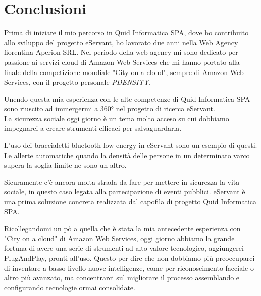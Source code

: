 \chapter{Conclusioni}

Prima di iniziare il mio percorso in Quid Informatica SPA, dove ho contribuito allo
sviluppo del progetto eServant, ho lavorato due anni nella Web Agency fiorentina Aperion SRL.
Nel periodo della web agency mi sono dedicato per passione ai servizi cloud di Amazon
Web Services che mi hanno portato alla finale della competizione mondiale "City on a
cloud", sempre di Amazon Web Services, con il progetto personale \textit{PDENSITY}.

Unendo questa mia esperienza con le alte competenze di Quid Informatica SPA sono 
riuscito ad immergermi a 360° nel progetto di ricerca eServant.\\

La sicurezza sociale oggi giorno è un tema molto acceso su cui dobbiamo
impegnarci a creare strumenti efficaci per salvaguardarla.

L'uso dei braccialetti bluetooth low energy in eServant sono un esempio di questi.
Le allerte automatiche quando la densità delle persone in un determinato varco
supera la soglia limite ne sono un altro.

Sicuramente c'è ancora molta strada da fare per mettere in sicurezza la vita 
sociale, in questo caso legata alla partecipazione di eventi pubblici. eServant 
è una prima soluzione concreta realizzata dal capofila di progetto Quid Informatica SPA.

Ricollegandomi un pò a quella che è stata la mia antecedente esperienza con "City on
a cloud" di Amazon Web Services, oggi giorno abbiamo la grande fortuna di avere
una serie di strumenti ad alto valore tecnologico, aggiungerei PlugAndPlay, pronti
all'uso.
Questo per dire che non dobbiamo più preoccuparci di inventare a basso livello 
nuove intelligenze, come per riconoscimento facciale o altro più avanzato, ma 
concentrarci sul migliorare il processo assemblando e configurando tecnologie
ormai consolidate.
